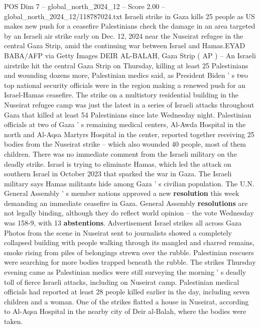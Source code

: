 \begin{textsample}{POS Dim 7 – global\_north\_2024\_12 – Score 2.00 – global\_north\_2024\_12/118787024.txt}  \label{ex:f7_pos_299}
Israeli strike in Gaza kills 25 people as US makes new push for a ceasefire Palestinians check the damage in an area targeted by an Israeli air strike early on Dec. 12, 2024 near the Nuseirat refugee in the central Gaza Strip, amid the continuing war between Israel and Hamas.EYAD BABA/AFP via Getty Images DEIR AL-BALAH, Gaza Strip ( AP ) -- An Israeli airstrike hit the central Gaza Strip on Thursday, killing at least 25 Palestinians and wounding dozens more, Palestinian medics said, as President Biden ' s two top national security officials were in the region making a renewed push for an Israel-Hamas ceasefire.
The strike on a multistory residential building in the Nuseirat refugee camp was just the latest in a series of Israeli attacks throughout Gaza that killed at least 54 Palestinians since late Wednesday night.
Palestinian officials at two of Gaza ' s remaining medical centers, Al-Awda Hospital in the north and Al-Aqsa Martyrs Hospital in the center, reported together receiving 25 bodies from the Nuseirat strike -- which also wounded 40 people, most of them children.
There was no immediate comment from the Israeli military on the deadly strike.
Israel is trying to eliminate Hamas, which led the attack on southern Israel in October 2023 that sparked the war in Gaza.
The Israeli military says Hamas militants hide among Gaza ' s civilian population.
The U.N.
General Assembly ' s member nations approved a new \textbf{resolution} this week demanding an immediate ceasefire in Gaza.
General Assembly \textbf{resolutions} are not legally binding, although they do reflect world opinion -- the vote Wednesday was 158-9, with 13 \textbf{abstentions}.
Advertisement Israel strikes all across Gaza Photos from the scene in Nuseirat sent to journalists showed a completely collapsed building with people walking through its mangled and charred remains, smoke rising from piles of belongings strewn over the rubble.
Palestinian rescuers were searching for more bodies trapped beneath the rubble.
The strikes Thursday evening came as Palestinian medics were still surveying the morning ' s deadly toll of fierce Israeli attacks, including on Nuseirat camp.
Palestinian medical officials had reported at least 28 people killed earlier in the day, including seven children and a woman.
One of the strikes flatted a house in Nuseirat, according to Al-Aqsa Hospital in the nearby city of Deir al-Balah, where the bodies were taken.

\end{textsample}
